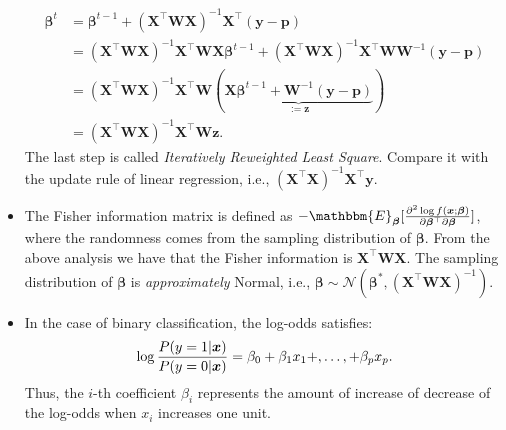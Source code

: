 \begin{itemize}
                    \begin{equation}
                        \begin{aligned}
                            \bm{\beta}^t & = \bm{\beta}^{t-1} + \left(\bm{X}^\top \bm{W} \bm{X}\right)^{-1} \bm{X}^\top (\bm{y} - \bm{p}) \\
                                         & = \left(\bm{X}^\top \bm{W} \bm{X}\right)^{-1}\bm{X}^\top \bm{W} \bm{X} \bm{\beta}^{t-1} + \left(\bm{X}^\top \bm{W} \bm{X}\right)^{-1} \bm{X}^\top \bm{W} \bm{W}^{-1} (\bm{y} - \bm{p}) \\
                                         & = \left(\bm{X}^\top \bm{W} \bm{X}\right)^{-1}\bm{X}^\top \bm{W} \left( \underbrace{\bm{X}\bm{\beta}^{t-1} + \bm{W}^{-1}(\bm{y} - \bm{p})}_{:=\bm{z}} \right) \\
                                         & = \left(\bm{X}^\top \bm{W} \bm{X}\right)^{-1}\bm{X}^\top \bm{W} \bm{z}.
                        \end{aligned}
                    \end{equation}
                The last step is called \emph{Iteratively Reweighted Least Square}.
                Compare it with the update rule of linear regression, i.e., $\left( \bm{X}^\top \bm{X}\right)^{-1} \bm{X}^\top \bm{y}$.
                \item The Fisher information matrix is defined as $-\mathbbm{E}_{\bm{\beta}}[ \frac{\partial^2 \log f(\bm{x}; \bm{\beta})}{\partial \bm{\beta}^\top \partial \bm{\beta}} ]$, where the randomness comes from the sampling distribution of $\bm{\beta}$.
                From the above analysis we have that the Fisher information is $\bm{X}^\top \bm{W} \bm{X}$.
                The sampling distribution of $\bm{\beta}$ is \emph{approximately} Normal, i.e., $\bm{\beta} \sim \mathcal{N}(\bm{\beta}^\ast, \left(\bm{X}^\top \bm{W} \bm{X}\right)^{-1})$.
                \item In the case of binary classification, the log-odds satisfies:
                    \begin{equation}
                        \log \frac{P(y=1 | \bm{x})}{P(y=0 | \bm{x})}  = \beta_0 + \beta_1 x_1 +, \ldots, + \beta_p x_p.
                    \end{equation}
                Thus, the $i$-th coefficient $\beta_i$ represents the amount of increase of decrease of the log-odds when $x_i$ increases one unit.
            \end{itemize}
            
